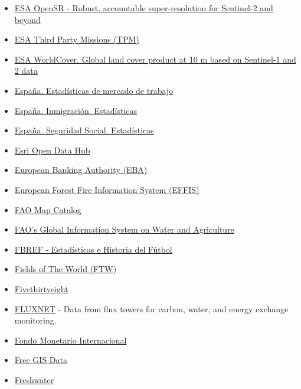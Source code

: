\documentclass[
  letterpaper,
  DIV=11,
  numbers=noendperiod]{scrartcl}
\begin{document}
\begin{itemize}
{  Daily Aggregates - Latest Climate Reanalysis Produced by ECMWF /
  Copernicus Climate Change Service}
\item
  \href{https://isp.uv.es/opensr/}{ESA OpenSR - Robust, accountable
  super-resolution for Sentinel-2 and beyond}
\item
  \href{https://earth.esa.int/eogateway/missions/third-party-missions}{ESA
  Third Party Missions (TPM)}
\item
  \href{https://esa-worldcover.org/en}{ESA WorldCover. Global land cover
  product at 10 m based on Sentinel-1 and 2 data}
\item
  \href{https://www.mites.gob.es/es/estadisticas/mercado_trabajo/index.htm}{España.
  Estadísticas de mercado de trabajo}
\item
  \href{https://www.inclusion.gob.es/web/opi/estadisticas}{España.
  Inmigración. Estadísticas}
\item
  \href{https://www.seg-social.es/wps/portal/wss/internet/EstadisticasPresupuestosEstudios/Estadisticas}{España.
  Seguridad Social. Estadísticas}
\item
  \href{https://hub.arcgis.com/search}{Esri Open Data Hub}
\item
  \href{https://www.eba.europa.eu/risk-and-data-analysis}{European
  Banking Authority (EBA)}
\item
  \href{https://forest-fire.emergency.copernicus.eu/}{European Forest
  Fire Information System (EFFIS)}
\item
  \href{https://data.apps.fao.org/catalog/}{FAO Map Catalog}
\item
  \href{https://www.fao.org/aquastat/en/geospatial-information/wapor}{FAO's
  Global Information System on Water and Agriculture}
\item
  \href{https://fbref.com/es/}{FBREF - Estadísticas e Historia del
  Fútbol}
\item
  \href{https://beta.source.coop/repositories/kerner-lab/fields-of-the-world/description/}{Fields
  of The World (FTW)}
\item
  \href{https://data.fivethirtyeight.com/}{Fivethirtyeight}
\item
  \href{https://fluxnet.org/}{FLUXNET} - Data from flux towers for
  carbon, water, and energy exchange monitoring.
\item
  \href{http://www.imf.org/en/data}{Fondo Monetario Internacional}
\item
  \href{http://freegisdata.rtwilson.com/}{Free GIS Data}
\item
  \href{https://www.worldwildlife.org/our-work/science/freshwater-ecoregions-of-the-world/}{Freshwater
}
\end{itemize}
\end{document}
